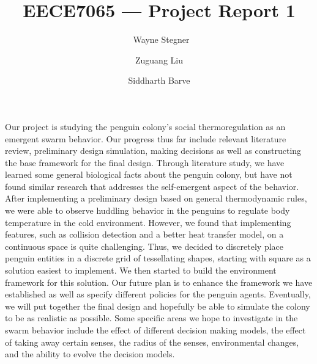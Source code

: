 \documentclass[12pt]{article}
\title{EECE7065 --- Project Report 1}
\author{\
		Wayne Stegner
		\and
		Zuguang Liu
		\and
		Siddharth Barve
}
\date{\vspace{-36pt}}
\begin{document}
		\maketitle

		\par Our project is studying the penguin colony’s social thermoregulation
		as an emergent swarm behavior.
		Our progress thus far include relevant literature review, preliminary
		design simulation, making decisions as well as constructing the base
		framework for the final design.
		Through literature study, we have learned some general biological facts
		about the penguin colony, but have not found similar research that
		addresses the self-emergent aspect of the behavior.
		After implementing a preliminary design based on general thermodynamic
		rules, we were able to observe huddling behavior in the penguins to
		regulate body temperature in the cold environment.
		However, we found that implementing features, such as collision detection
		and a better heat transfer model, on a continuous space is quite
		challenging.
		Thus, we decided to discretely place penguin entities in a discrete grid of
		tessellating shapes, starting with square as a solution easiest to
		implement.
		We then started to build the environment framework for this solution.
		Our future plan is to enhance the framework we have established as well as
		specify different policies for the penguin agents.
		Eventually, we will put together the final design and hopefully be able to
		simulate the colony to be as realistic as possible.
		Some specific areas we hope to investigate in the swarm behavior include
		the effect of different decision making models, the effect of taking away
		certain senses, the radius of the senses, environmental changes, and the
		ability to evolve the decision models.
\end{document}
